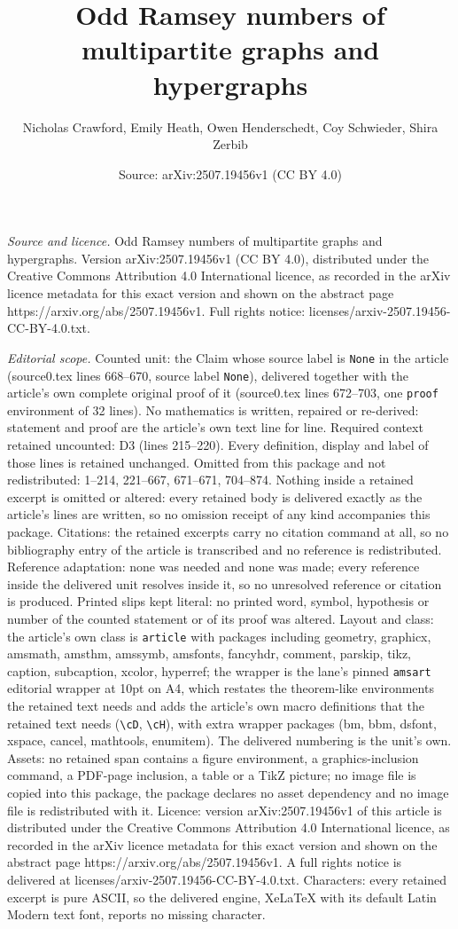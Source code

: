 \documentclass[10pt,a4paper]{amsart}
\title[Odd Ramsey numbers of multipartite graphs and hypergraphs]{Odd Ramsey numbers of multipartite graphs and hypergraphs}
\author{Nicholas Crawford, Emily Heath, Owen Henderschedt, Coy Schwieder, Shira Zerbib}
\date{Source: arXiv:2507.19456v1 (CC BY 4.0)}
\begin{document}
\maketitle

\noindent\emph{Source and licence.} Odd Ramsey numbers of multipartite graphs and hypergraphs. Version arXiv:2507.19456v1 (CC BY 4.0), distributed under the Creative Commons Attribution 4.0 International licence, as recorded in the arXiv licence metadata for this exact version and shown on the abstract page https://arxiv.org/abs/2507.19456v1. Full rights notice: licenses/arxiv-2507.19456-CC-BY-4.0.txt.\par\smallskip

\noindent\textit{Editorial scope.} Counted unit: the Claim whose source label is \texttt{None} in the article (source0.tex lines 668--670, source label \texttt{None}), delivered together with the article's own complete original proof of it (source0.tex lines 672--703, one \texttt{proof} environment of 32 lines). No mathematics is written, repaired or re-derived: statement and proof are the article's own text line for line. Required context retained uncounted: D3 (lines 215--220). Every definition, display and label of those lines is retained unchanged. Omitted from this package and not redistributed: 1--214, 221--667, 671--671, 704--874. Nothing inside a retained excerpt is omitted or altered: every retained body is delivered exactly as the article's lines are written, so no omission receipt of any kind accompanies this package. Citations: the retained excerpts carry no citation command at all, so no bibliography entry of the article is transcribed and no reference is redistributed. Reference adaptation: none was needed and none was made; every reference inside the delivered unit resolves inside it, so no unresolved reference or citation is produced. Printed slips kept literal: no printed word, symbol, hypothesis or number of the counted statement or of its proof was altered. Layout and class: the article's own class is \texttt{article} with packages including geometry, graphicx, amsmath, amsthm, amssymb, amsfonts, fancyhdr, comment, parskip, tikz, caption, subcaption, xcolor, hyperref; the wrapper is the lane's pinned \texttt{amsart} editorial wrapper at 10pt on A4, which restates the theorem-like environments the retained text needs and adds the article's own macro definitions that the retained text needs (\texttt{\textbackslash cD}, \texttt{\textbackslash cH}), with extra wrapper packages (bm, bbm, dsfont, xspace, cancel, mathtools, enumitem). The delivered numbering is the unit's own. Assets: no retained span contains a figure environment, a graphics-inclusion command, a PDF-page inclusion, a table or a TikZ picture; no image file is copied into this package, the package declares no asset dependency and no image file is redistributed with it. Licence: version arXiv:2507.19456v1 of this article is distributed under the Creative Commons Attribution 4.0 International licence, as recorded in the arXiv licence metadata for this exact version and shown on the abstract page https://arxiv.org/abs/2507.19456v1. A full rights notice is delivered at licenses/arxiv-2507.19456-CC-BY-4.0.txt. Characters: every retained excerpt is pure ASCII, so the delivered engine, XeLaTeX with its default Latin Modern text font, reports no missing character.
\end{document}
